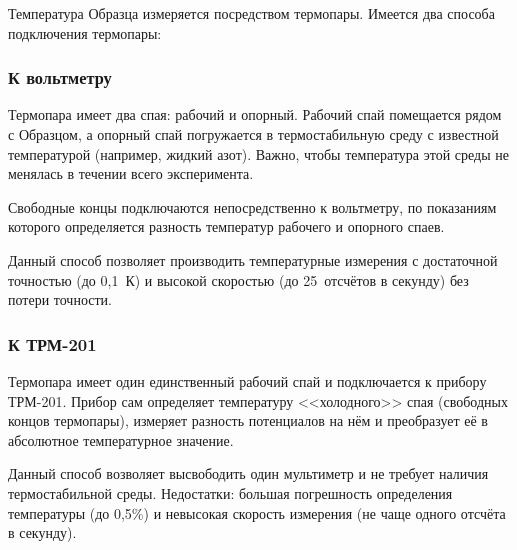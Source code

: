 \label{sec_t_measures}

Температура Образца измеряется посредством термопары. Имеется два способа подключения термопары:

\subsubsection*{К вольтметру}

Термопара имеет два спая: рабочий и опорный. Рабочий спай помещается рядом с Образцом, а опорный спай погружается в термостабильную среду с известной температурой (например, жидкий азот). Важно, чтобы температура этой среды не менялась в течении всего эксперимента.

Свободные концы подключаются непосредственно к вольтметру, по показаниям которого определяется разность температур рабочего и опорного спаев.

Данный способ позволяет производить температурные измерения с достаточной точностью (до 0,1~К) и высокой скоростью (до 25~отсчётов в секунду) без потери точности.

\subsubsection*{К ТРМ-201}

Термопара имеет один единственный рабочий спай и подключается к прибору ТРМ-201. Прибор сам определяет температуру <<холодного>> спая (свободных концов термопары), измеряет разность потенциалов на нём и преобразует её в абсолютное температурное значение.

Данный способ возволяет высвободить один мультиметр и не требует наличия термостабильной среды. Недостатки: большая погрешность определения температуры (до 0,5\%) и невысокая скорость измерения (не чаще одного отсчёта в секунду).